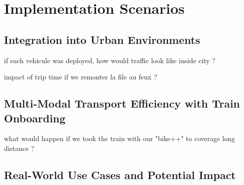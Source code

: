 \section{Implementation Scenarios}

\subsection{Integration into Urban Environments}
if such vehicule was deployed, how would traffic look like inside city ? 

impact of trip time if we remonter la file au feux ?

\subsection{Multi-Modal Transport Efficiency with Train Onboarding}
what would happen if we took the train with our "bike++" to coverage long distance ?

\subsection{Real-World Use Cases and Potential Impact}